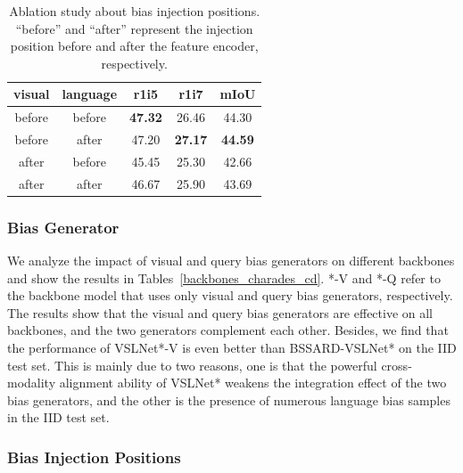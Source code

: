 \begin{table}[t]
	\centering
	\renewcommand{\arraystretch}{1}
	\begin{tabular}{c c c c c}
		\toprule
		visual & language & r1i5 & r1i7 & mIoU\\
		\midrule
		before & before & {\bf 47.32} & 26.46 & 44.30 \\
		before & after & 47.20 & {\bf 27.17} & {\bf 44.59} \\
		after & before & 45.45 & 25.30 & 42.66 \\
		after & after & 46.67 & 25.90 & 43.69 \\
		\bottomrule
	\end{tabular}
	\caption{Ablation study about bias injection positions. ``before'' and ``after'' represent the injection position before and after the feature encoder, respectively.}
	\label{bias_injection_positions}
\end{table}


\subsubsection{Bias Generator}

We analyze the impact of visual and query bias generators on different backbones and show the results in Tables~\ref{backbones_charades_cd}.
*-V and *-Q refer to the backbone model that uses only visual and query bias generators, respectively. The results show that the visual and query bias generators are effective on all backbones, and the two generators complement each other. 
Besides, we find that the performance of VSLNet*-V is even better than BSSARD-VSLNet* on the IID test set. This is mainly due to two reasons, one is that the powerful cross-modality alignment ability of VSLNet* weakens the integration effect of the two bias generators, and the other is the presence of numerous language bias samples in the IID test set.


\subsubsection{Bias Injection Positions}

